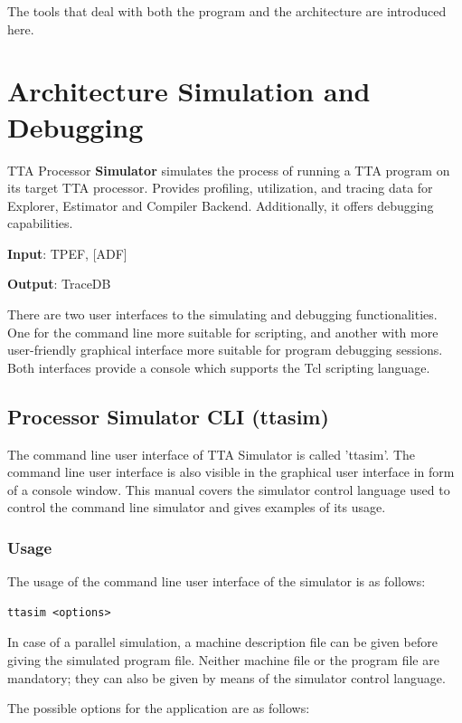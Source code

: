 \documentclass[a4paper,twoside]{tceusermanual}
\begin{document}
The tools that deal with both the program and the architecture are
introduced here.


\section{Architecture Simulation and Debugging}

TTA Processor \textbf{Simulator} simulates the process of running a TTA
program on its target TTA processor. Provides profiling, utilization, and 
tracing data for Explorer, Estimator and Compiler Backend.  Additionally, 
it offers debugging capabilities. 

\textbf{Input}: TPEF, [ADF]

\textbf{Output}: TraceDB

There are two user interfaces to the simulating and debugging
functionalities. One for the command line more suitable for scripting, and
another with more user-friendly graphical interface more suitable for
program debugging sessions. Both interfaces provide a console which
supports the Tcl scripting language.

\subsection{Processor Simulator CLI (ttasim)}
\label{section:ttasim}

The command line user interface of TTA Simulator is called 'ttasim'. The command
line user interface is also visible in the graphical user interface in form of a
console window. This manual covers the simulator control language used to
control the command line simulator and gives examples of its usage.

\subsubsection{Usage}

The usage of the command line user interface of the simulator is as follows:

\begin{verbatim}
ttasim <options>
\end{verbatim}

In case of a parallel simulation, a machine description file can be given before
giving the simulated program file. Neither machine file or the program file are mandatory;
they can also be given by means of the simulator control language.

The possible options for the application are as follows:\\
\end{document}
